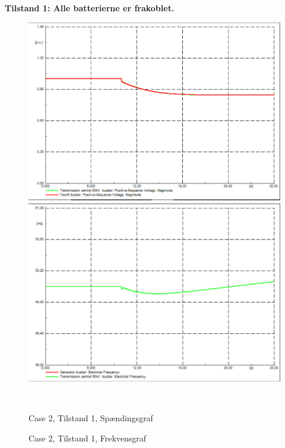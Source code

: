 \textbf{Tilstand 1: Alle batterierne er frakoblet.}
\begin{figure}[H]
	\centering
	\begin{minipage}[b]{0.48\textwidth}
		\centering
		\includegraphics[width=1.00\textwidth]{figurer/LargeDisturbance/Voltage1} %
	\end{minipage}
	\hfill
	\begin{minipage}[b]{0.48\textwidth}
		\centering
		\includegraphics[width=1.00\textwidth]{figurer/LargeDisturbance/Freq1} %
	\end{minipage}
	\\ %
	\begin{minipage}[t]{0.48\textwidth}
		\caption{Case 2, Tilstand 1, Spændingsgraf} %
		\label{fig:C2T1V}
	\end{minipage}
	\hfill
	\begin{minipage}[t]{0.48\textwidth}
		\caption{Case 2, Tilstand 1, Frekvensgraf} %
		\label{fig:C2T1F}
	\end{minipage}
\end{figure}

